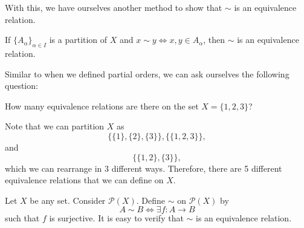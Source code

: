 \documentclass[notoc,notitlepage]{tufte-book}
\begin{document}
With this, we have ourselves another method to show that $\sim$ is an equivalence relation.

\begin{propo}\label{propo:characterization_of_an_equivalence_relation}
  If $\{ A_\alpha \}_{\alpha \in I}$ is a partition of $X$ and $x \sim y \iff x, y \in A_{\alpha}$, then $\sim$ is an equivalence relation.
\end{propo}

Similar to when we defined partial orders, we can ask ourselves the following question:

\begin{eg}
  How many equivalence relations are there on the set $X = \{1, 2, 3\}$?

\end{eg}

\begin{solution}
  Note that we can partition $X$ as
  \begin{equation*}
    \{ \{1\}, \{2\}, \{3\} \}, \{ \{1, 2, 3\} \},
  \end{equation*}
  and
  \begin{equation*}
    \{ \{1, 2\}, \{3\} \},
  \end{equation*}
  which we can rearrange in 3 different ways. Therefore, there are 5 different equivalence relations that we can define on $X$.
\end{solution}

\begin{eg}\label{eg:same_cardinaliy}
  Let $X$ be any set. Consider $\mathcal{P}(X)$. Define $\sim$ on $\mathcal{P}(X)$ by
  \begin{equation*}
    A \sim B \iff \exists f: A \to B
  \end{equation*}
  such that $f$ is surjective. It is easy to verify that $\sim$ is an equivalence relation.
\end{eg}


\end{document}
